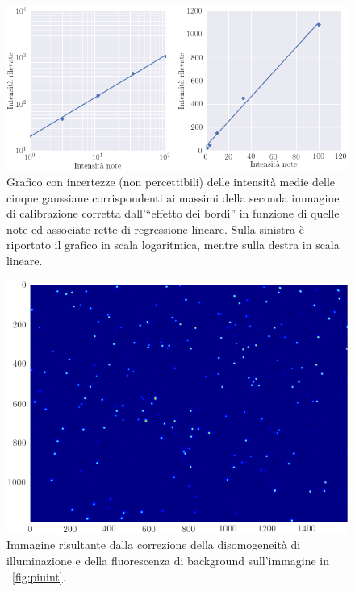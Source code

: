 \begin{figure}
 \centering
 \includegraphics[scale=.55]{img/CAP3linearita.png}
 \caption{\small{Grafico con incertezze (non percettibili) delle intensità medie delle cinque gaussiane corrispondenti ai massimi della seconda immagine di calibrazione corretta dall'``effetto dei bordi'' in funzione di quelle note ed associate rette di regressione lineare. Sulla sinistra è riportato il grafico in scala logaritmica, mentre sulla destra in scala lineare.}}
 \label{fig:linearita}
\end{figure}


\begin{figure}[p]
 \centering
 \includegraphics[scale=.64]{img/CAP3piuintcorr.png}
 \caption{\small{Immagine risultante dalla correzione della disomogeneità di illuminazione e della fluorescenza di background sull'immagine in \figurename~\ref{fig:piuint}.}}
 \label{fig:piuintcorr}
\end{figure}

